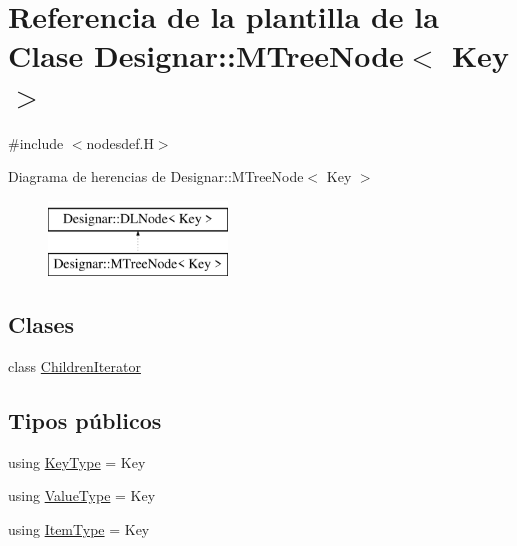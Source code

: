 \hypertarget{class_designar_1_1_m_tree_node}{}\section{Referencia de la plantilla de la Clase Designar\+:\+:M\+Tree\+Node$<$ Key $>$}
\label{class_designar_1_1_m_tree_node}


{\ttfamily \#include $<$nodesdef.\+H$>$}

Diagrama de herencias de Designar\+:\+:M\+Tree\+Node$<$ Key $>$\begin{figure}[H]
\begin{center}
\leavevmode
\includegraphics[height=2.000000cm]{class_designar_1_1_m_tree_node}
\end{center}
\end{figure}
\subsection*{Clases}
\begin{DoxyCompactItemize}
\item 
class \hyperlink{class_designar_1_1_m_tree_node_1_1_children_iterator}{Children\+Iterator}
\end{DoxyCompactItemize}
\subsection*{Tipos públicos}
\begin{DoxyCompactItemize}
\item 
using \hyperlink{class_designar_1_1_m_tree_node_ad45f6141e36722448b45aecde08761a0}{Key\+Type} = Key
\item 
using \hyperlink{class_designar_1_1_m_tree_node_a0f65c3ec41fb24ab7764c01cd949d6be}{Value\+Type} = Key
\item 
using \hyperlink{class_designar_1_1_m_tree_node_aa649a0376eb81e3da0f4dcbd36871b4b}{Item\+Type} = Key
\end{DoxyCompactItemize}
